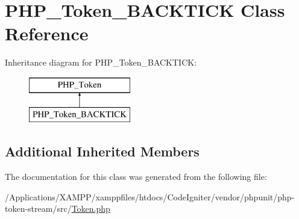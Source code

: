 \hypertarget{class_p_h_p___token___b_a_c_k_t_i_c_k}{}\section{P\+H\+P\+\_\+\+Token\+\_\+\+B\+A\+C\+K\+T\+I\+CK Class Reference}
\label{class_p_h_p___token___b_a_c_k_t_i_c_k}
Inheritance diagram for P\+H\+P\+\_\+\+Token\+\_\+\+B\+A\+C\+K\+T\+I\+CK\+:\begin{figure}[H]
\begin{center}
\leavevmode
\includegraphics[height=2.000000cm]{class_p_h_p___token___b_a_c_k_t_i_c_k}
\end{center}
\end{figure}
\subsection*{Additional Inherited Members}


The documentation for this class was generated from the following file\+:\begin{DoxyCompactItemize}
\item 
/\+Applications/\+X\+A\+M\+P\+P/xamppfiles/htdocs/\+Code\+Igniter/vendor/phpunit/php-\/token-\/stream/src/\mbox{\hyperlink{_token_8php}{Token.\+php}}\end{DoxyCompactItemize}
